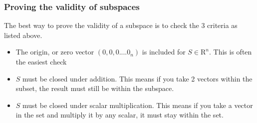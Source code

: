 \documentclass[11pt]{book}
\begin{document}
{\subsubsection{Proving the validity of subspaces}
\par{The best way to prove the validity of a subspace is to check the 3 criteria as listed above.}
\begin{itemize}
	\item{The origin, or zero vector $\left(0,0,0....0_{n}\right)$ is included for $S\in\mathrm{R}^{n}$. This is often the easiest check}
	\item{$S$ must be closed under addition. This means if you take 2 vectors within the subset, the result must still be within the subspace.}
	\item{$S$ must be closed under scalar multiplication. This means if you take a vector in the set and multiply it by any scalar, it must stay within the set.}
\end{itemize}
}
\end{document}
